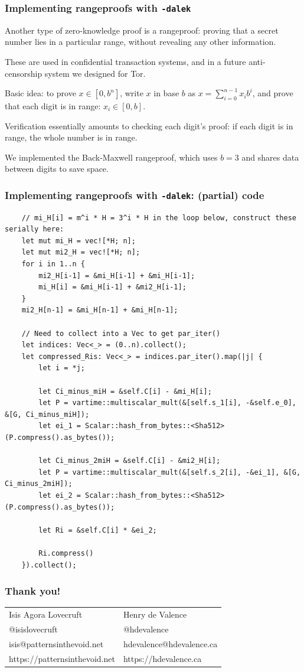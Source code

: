 \documentclass[xetex,aspectratio=169]{beamer}
\begin{document}
  \begin{frame}
    \frametitle{Implementing rangeproofs with \texttt{-dalek}}
    
    Another type of zero-knowledge proof is a \alert{rangeproof}: proving that a secret number lies in a particular range, without revealing any other information.
    
    \pause These are used in confidential transaction systems, and in a future anti-censorship system we designed for Tor.
    
    \pause Basic idea: to prove $x \in [0, b^n]$, write $x$ in base $b$ as $x = \sum_{i=0}^{n-1} x_i b^i$, and prove that each digit is in range: $x_i \in [0,b]$.
    
    \pause Verification essentially amounts to checking each digit's proof: if each digit is in range, the whole number is in range.
    
    \pause We implemented the Back-Maxwell rangeproof, which uses $b=3$ and shares data between digits to save space.
  \end{frame}

\begin{frame}[fragile]
    \frametitle{Implementing rangeproofs with \texttt{-dalek}: (partial) code}
    {\tiny
    \begin{verbatim}
    // mi_H[i] = m^i * H = 3^i * H in the loop below, construct these serially here:
    let mut mi_H = vec![*H; n];
    let mut mi2_H = vec![*H; n];
    for i in 1..n {
        mi2_H[i-1] = &mi_H[i-1] + &mi_H[i-1];
        mi_H[i] = &mi_H[i-1] + &mi2_H[i-1];
    }
    mi2_H[n-1] = &mi_H[n-1] + &mi_H[n-1];

    // Need to collect into a Vec to get par_iter()
    let indices: Vec<_> = (0..n).collect();
    let compressed_Ris: Vec<_> = indices.par_iter().map(|j| {
        let i = *j;

        let Ci_minus_miH = &self.C[i] - &mi_H[i];
        let P = vartime::multiscalar_mult(&[self.s_1[i], -&self.e_0], &[G, Ci_minus_miH]);
        let ei_1 = Scalar::hash_from_bytes::<Sha512>(P.compress().as_bytes());

        let Ci_minus_2miH = &self.C[i] - &mi2_H[i];
        let P = vartime::multiscalar_mult(&[self.s_2[i], -&ei_1], &[G, Ci_minus_2miH]);
        let ei_2 = Scalar::hash_from_bytes::<Sha512>(P.compress().as_bytes());

        let Ri = &self.C[i] * &ei_2;

        Ri.compress()
    }).collect();
    \end{verbatim}
    }
\end{frame}

  \begin{frame}
    \frametitle{Thank you!}
    \begin{tabular}{ll}
      Isis Agora Lovecruft & Henry de Valence \\
      @isislovecruft       & @hdevalence \\
      isis@patternsinthevoid.net & hdevalence@hdevalence.ca \\
      https://patternsinthevoid.net & https://hdevalence.ca
    \end{tabular}
  \end{frame}
\end{document}
